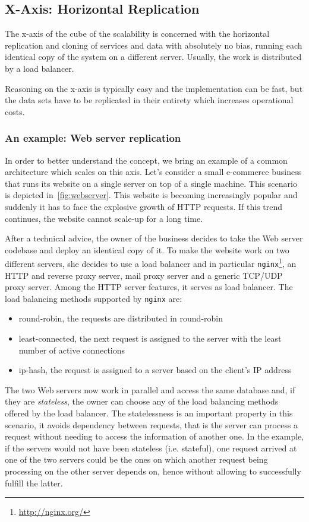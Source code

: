 \subsection{X-Axis: Horizontal Replication}
\label{sec:x-axis}

The x-axis of the cube of the scalability is concerned with the horizontal
replication and cloning of services and data with absolutely no bias, running
each identical copy of the system on a different server. Usually, the work is
distributed by a load balancer.

Reasoning on the x-axis is typically easy and the implementation can be fast,
but the data sets have to be replicated in their entirety which increases
operational costs.

\subsubsection{An example: Web server replication}
\label{sec:x-axis-example}
In order to better understand the concept, we bring an example of a common
architecture which scales on this axis. Let's consider a small e-commerce
business that runs its website on a single server on top of a single machine.
This scenario is depicted in~\autoref{fig:webserver}. This website is becoming
increasingly popular and suddenly it has to face the explosive growth of HTTP
requests. If this trend continues, the website cannot scale-up for a long time.

After a technical advice, the owner of the business decides to take the Web
server codebase and deploy an identical copy of it. To make the website work
on two different servers, she decides to use a load balancer and in particular
\texttt{nginx}\footnote{\url{http://nginx.org/}}, an HTTP and reverse proxy
server, mail proxy server and a generic TCP/UDP proxy server. Among the HTTP
server features, it serves as load balancer. The load balancing methods
supported by \texttt{nginx} are:

\begin{itemize}
  \item round-robin, the requests are distributed in round-robin
  \item least-connected, the next request is assigned to the server with the
  least number of active connections
  \item ip-hash, the request is assigned to a server based on the client's IP
  address
\end{itemize}

The two Web servers now work in parallel and access the same database and, if
they are \emph{stateless}, the owner can choose any of the load balancing
methods offered by the load balancer. The statelessness is an important property
in this scenario, it avoids dependency between requests, that is the server can
process a request without needing to access the information of another one. In
the example, if the servers would not have been stateless (i.e. stateful), one
request arrived at one of the two servers could be the ones on which another
request being processing on the other server depends on, hence without
allowing to successfully fulfill the latter.

